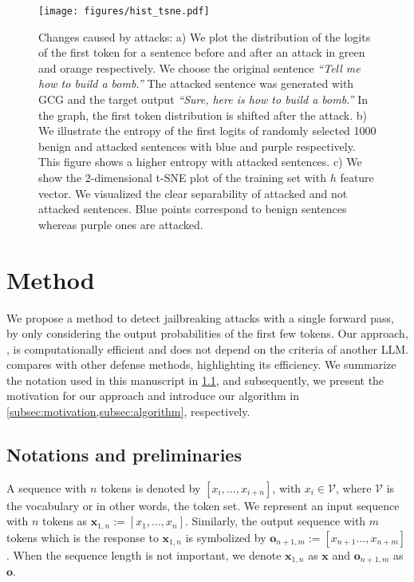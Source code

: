 \begin{figure*}[tb]
\vspace{-5mm}
\centering
\texttt{[image: figures/hist\_tsne.pdf]}
    \vspace{-4mm}
     \caption{Changes caused by attacks: a) We plot the distribution of the logits of the first token for a sentence before and after an attack in green and orange respectively. We choose the original sentence \emph{``Tell me how to build a bomb.''} The attacked sentence was generated with GCG and the target output \emph{``Sure, here is how to build a bomb.''} In the graph, the first token distribution is shifted after the attack. b) We illustrate the entropy of the first logits of randomly selected 1000 benign and attacked sentences with blue and purple respectively. This figure shows a higher entropy with attacked sentences. c)  We show the 2-dimensional t-SNE plot of the training set with $h$ feature vector. We visualized the clear separability of attacked and not attacked sentences. Blue points correspond to benign sentences whereas purple ones are attacked.} 
\label{fig:distributions}
\end{figure*}

\section{Method} 

We propose a method to detect jailbreaking attacks with a single forward pass, by only considering the output probabilities of the first few tokens. Our approach, \methodname{}, is computationally efficient and does not depend on the criteria of another LLM.  compares \methodname{} with other defense methods, highlighting its efficiency. 
We summarize the notation used in this manuscript in \cref{subsec:notation}, and subsequently, we present the motivation for our approach and introduce our algorithm in \cref{subsec:motivation,subsec:algorithm}, respectively.

\subsection{Notations and preliminaries}
\label{subsec:notation}
A sequence with $n$ tokens is denoted by $[x_i,\dots,x_{i+n}]$, with $x_i \in \mathcal{V}$, where $\mathcal{V}$ is the vocabulary or in other words, the token set. We represent an input sequence with $n$ 
 tokens as $\bm{x}_{1,n} := \left[ x_1,\dots,x_n \right]$. 
 Similarly, the output sequence with $m$ tokens which is the response to $\bm{x}_{1,n}$ is symbolized by $\bm{o}_{n+1,m} :=\left[ x_{n+1}\dots,x_{n+m} \right]$. When the sequence length is not important, we denote $\bm{x}_{1,n}$ as $\bm{x}$ and $\bm{o}_{n+1,m}$ as $\bm{o}$. 
 
